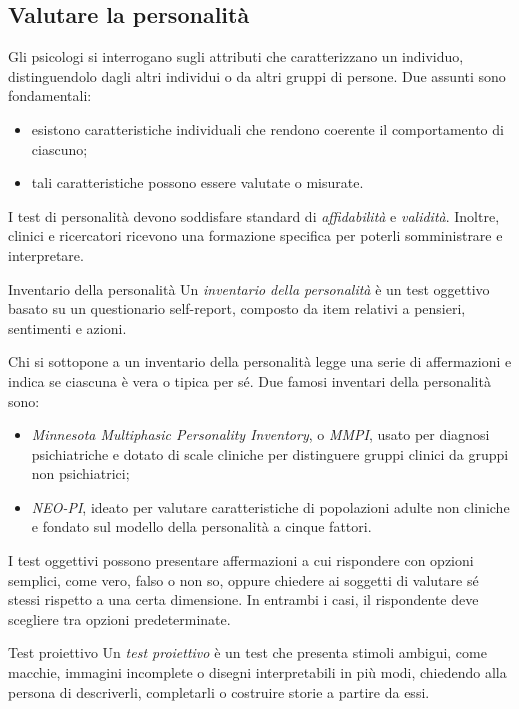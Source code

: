 \documentclass[a4paper]{article}
\begin{document}
\subsection{Valutare la personalità}
Gli psicologi si interrogano sugli attributi che caratterizzano un individuo, distinguendolo dagli altri individui o da altri gruppi di persone.
Due assunti sono fondamentali:
\begin{itemize}
    \item esistono caratteristiche individuali che rendono coerente il comportamento di ciascuno;
    \item tali caratteristiche possono essere valutate o misurate.
\end{itemize}
I test di personalità devono soddisfare standard di \emph{affidabilità} e \emph{validità}. Inoltre, clinici e ricercatori ricevono una formazione specifica per poterli somministrare e interpretare.
\begin{snippetdefinition}{Inventario della personalità}
    Un \emph{inventario della personalità} è un test oggettivo basato su un questionario self-report, composto da item relativi a pensieri, sentimenti e azioni.
\end{snippetdefinition}
Chi si sottopone a un inventario della personalità legge una serie di affermazioni e indica se ciascuna è vera o tipica per sé.
Due famosi inventari della personalità sono:
\begin{itemize}
    \item \emph{Minnesota Multiphasic Personality Inventory}, o \emph{MMPI}, usato per diagnosi psichiatriche e dotato di scale cliniche per distinguere gruppi clinici da gruppi non psichiatrici;
    \item \emph{NEO-PI}, ideato per valutare caratteristiche di popolazioni adulte non cliniche e fondato sul modello della personalità a cinque fattori.
\end{itemize}
I test oggettivi possono presentare affermazioni a cui rispondere con opzioni semplici, come vero, falso o non so, oppure chiedere ai soggetti di valutare sé stessi rispetto a una certa dimensione. In entrambi i casi, il rispondente deve scegliere tra opzioni predeterminate.
\begin{snippetdefinition}{Test proiettivo}
    Un \emph{test proiettivo} è un test che presenta stimoli ambigui, come macchie, immagini incomplete o disegni interpretabili in più modi, chiedendo alla persona di descriverli, completarli o costruire storie a partire da essi.
\end{snippetdefinition}
\end{document}

